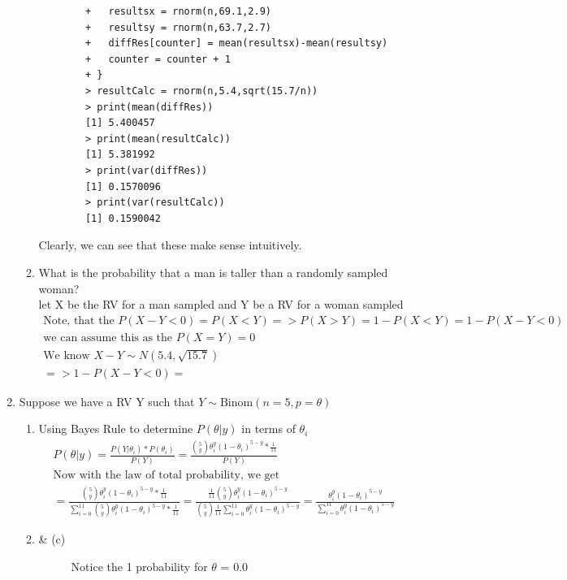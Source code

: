 \documentclass[11pt]{article}
\begin{document}
\begin{enumerate}
\begin{enumerate}
\begin{verbatim}
		+   resultsx = rnorm(n,69.1,2.9)
		+   resultsy = rnorm(n,63.7,2.7)
		+   diffRes[counter] = mean(resultsx)-mean(resultsy)
		+   counter = counter + 1
		+ }
		> resultCalc = rnorm(n,5.4,sqrt(15.7/n))
		> print(mean(diffRes))
		[1] 5.400457
		> print(mean(resultCalc))
		[1] 5.381992
		> print(var(diffRes))
		[1] 0.1570096
		> print(var(resultCalc))
		[1] 0.1590042
	\end{verbatim}
	Clearly, we can see that these make sense intuitively.\\
	\item What is the probability that a man is taller than a randomly sampled woman?\\
	let X be the RV for a man sampled and Y be a RV for a woman sampled
	\begin{gather}
		\text{Note, that the } P(X-Y<0) = P(X<Y) => P(X>Y) = 1 - P(X<Y) = 1 -P(X-Y<0) \\
		\text{we can assume this as the } P(X=Y) = 0\\
		\text{We know } X-Y \sim N(5.4,\sqrt{15.7})\\
		=> 1-P(X-Y<0) = 
	\end{gather}
\end{enumerate}
\item Suppose we have a RV Y such that $Y \sim \text{Binom}(n=5,p = \theta)$
\begin{enumerate}
	\item Using Bayes Rule to determine $P(\theta | y)$ in terms of $\theta_i$
	\begin{gather}
		 P(\theta | y) = \frac{P(Y | \theta_i) * P(\theta_i)}{P(Y)} = \frac{\binom{5}{y} \theta_i^y(1-\theta_i)^{5-y} * \frac{1}{11}}{P(Y)}
		 \\
		 \text{Now with the law of total probability, we get}\\
		 = \frac{\binom{5}{y} \theta_i^y(1-\theta_i)^{5-y} * \frac{1}{11}}{\sum_{i=0}^{11}\binom{5}{y} \theta_i^y(1-\theta_i)^{5-y} * \frac{1}{11}} = \frac{\frac{1}{11}\binom{5}{y} \theta_i^y(1-\theta_i)^{5-y}}{\binom{5}{y} \frac{1}{11}\sum_{i=0}^{11} \theta_i^y(1-\theta_i)^{5-y}} = \frac{ \theta_i^y(1-\theta_i)^{5-y}}{\sum_{i=0}^{11} \theta_i^y(1-\theta_i)^{5-y}}
	\end{gather}
	\item \& (c)
	\begin{figure}[H]
		\centering
		\caption{Notice the 1 probability for $\theta$ = 0.0}

\end{figure}
\end{enumerate}
\end{enumerate}
\end{document}
